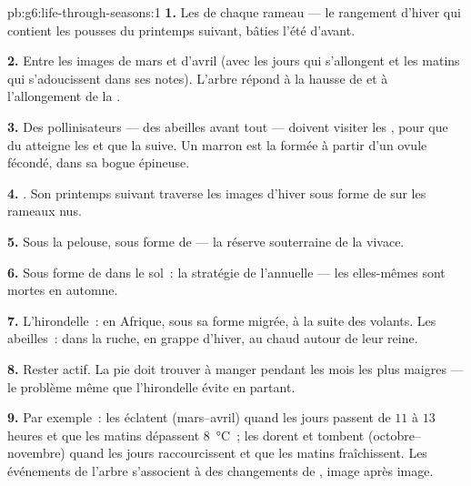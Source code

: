 \begin{solution}{pb:g6:life-through-seasons:1}
\textbf{1.} Les  de chaque rameau --- le rangement d'hiver
qui contient les pousses du printemps suivant, bâties l'été d'avant.

\textbf{2.} Entre les images de mars et d'avril (avec les jours qui
s'allongent et les matins qui s'adoucissent dans ses notes).
L'arbre répond à la hausse de  et à l'allongement de la
.

\textbf{3.} Des  pollinisateurs --- des abeilles avant tout
--- doivent visiter les , pour que du  atteigne les
 et que la  suive. Un marron est la  formée
à partir d'un ovule fécondé, dans sa bogue épineuse.

\textbf{4.} . Son printemps suivant traverse les images
d'hiver sous forme de  sur les rameaux nus.

\textbf{5.} Sous la pelouse, sous forme de  --- la réserve
souterraine de la vivace.

\textbf{6.} Sous forme de  dans le sol~: la stratégie de
l'annuelle --- les  elles-mêmes sont mortes en automne.

\textbf{7.} L'hirondelle~: en Afrique, sous sa forme migrée, à la
suite des  volants. Les abeilles~: dans la ruche, en grappe
d'hiver, au chaud autour de leur reine.

\textbf{8.} Rester actif. La pie doit trouver à manger pendant les
mois les plus maigres --- le problème même que l'hirondelle évite en
partant.

\textbf{9.} Par exemple~: les  éclatent (mars--avril) quand
les jours passent de $11$ à $13$ heures et que les matins dépassent
\qty{8}{\degreeCelsius}~; les  dorent et tombent
(octobre--novembre) quand les jours raccourcissent et que les matins
fraîchissent. Les événements de l'arbre s'associent à des
changements de , image après image.


\end{solution}
